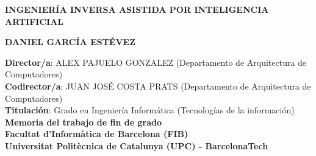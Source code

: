 \thispagestyle{empty}

\begin{figure}[htb]
  \centerline{}
\end{figure}

\begin{center}
  \vspace{2cm}
  {\Large {\bf INGENIERÍA INVERSA ASISTIDA POR INTELIGENCIA ARTIFICIAL}}
 
  \vspace{6cm}
  {\large {\bf DANIEL GARCÍA ESTÉVEZ}}
  
  \vfill
  {\bf Director/a}: ALEX PAJUELO GONZALEZ (Departamento de Arquitectura de Computadores) \\
  {\bf Codirector/a}: JUAN JOSÉ COSTA PRATS (Departamento de Arquitectura de Computadores) \\
  {\bf Titulación}: Grado en Ingeniería Informática (Tecnologías de la información) \\
  \vspace{0.5cm}
  {\bf Memoria del trabajo de fin de grado} \\
  {\bf Facultat d'Informàtica de Barcelona (FIB)} \\
  {\bf Universitat Politècnica de Catalunya (UPC) - BarcelonaTech} \\

\end{center}
